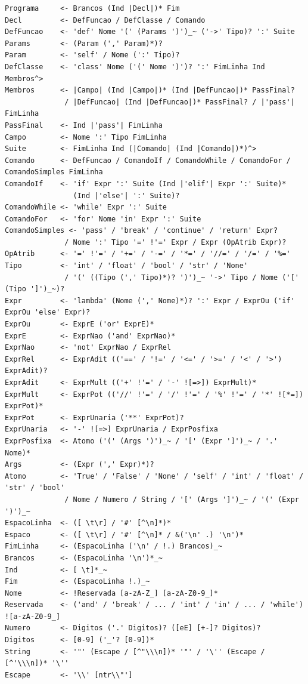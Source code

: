 \documentclass[12pt,a4paper]{article}
\begin{document}
\begin{lstlisting}[style=gram]
Programa     <- Brancos (Ind |Decl|)* Fim
Decl         <- DefFuncao / DefClasse / Comando
DefFuncao    <- 'def' Nome '(' (Params ')')_~ ('->' Tipo)? ':' Suite
Params       <- (Param (',' Param)*)?
Param        <- 'self' / Nome (':' Tipo)?
DefClasse    <- 'class' Nome ('(' Nome ')')? ':' FimLinha Ind Membros^>
Membros      <- |Campo| (Ind |Campo|)* (Ind |DefFuncao|)* PassFinal?
              / |DefFuncao| (Ind |DefFuncao|)* PassFinal? / |'pass'| FimLinha
PassFinal    <- Ind |'pass'| FimLinha
Campo        <- Nome ':' Tipo FimLinha
Suite        <- FimLinha Ind (|Comando| (Ind |Comando|)*)^>
Comando      <- DefFuncao / ComandoIf / ComandoWhile / ComandoFor / ComandoSimples FimLinha
ComandoIf    <- 'if' Expr ':' Suite (Ind |'elif'| Expr ':' Suite)*
                (Ind |'else'| ':' Suite)?
ComandoWhile <- 'while' Expr ':' Suite
ComandoFor   <- 'for' Nome 'in' Expr ':' Suite
ComandoSimples <- 'pass' / 'break' / 'continue' / 'return' Expr?
              / Nome ':' Tipo '=' !'=' Expr / Expr (OpAtrib Expr)?
OpAtrib      <- '=' !'=' / '+=' / '-=' / '*=' / '//=' / '/=' / '%='
Tipo         <- 'int' / 'float' / 'bool' / 'str' / 'None'
              / '(' ((Tipo (',' Tipo)*)? ')')_~ '->' Tipo / Nome ('[' (Tipo ']')_~)?
Expr         <- 'lambda' (Nome (',' Nome)*)? ':' Expr / ExprOu ('if' ExprOu 'else' Expr)?
ExprOu       <- ExprE ('or' ExprE)*
ExprE        <- ExprNao ('and' ExprNao)*
ExprNao      <- 'not' ExprNao / ExprRel
ExprRel      <- ExprAdit (('==' / '!=' / '<=' / '>=' / '<' / '>') ExprAdit)?
ExprAdit     <- ExprMult (('+' !'=' / '-' ![=>]) ExprMult)*
ExprMult     <- ExprPot (('//' !'=' / '/' !'=' / '%' !'=' / '*' ![*=]) ExprPot)*
ExprPot      <- ExprUnaria ('**' ExprPot)?
ExprUnaria   <- '-' ![=>] ExprUnaria / ExprPosfixa
ExprPosfixa  <- Atomo ('(' (Args ')')_~ / '[' (Expr ']')_~ / '.' Nome)*
Args         <- (Expr (',' Expr)*)?
Atomo        <- 'True' / 'False' / 'None' / 'self' / 'int' / 'float' / 'str' / 'bool'
              / Nome / Numero / String / '[' (Args ']')_~ / '(' (Expr ')')_~
EspacoLinha  <- ([ \t\r] / '#' [^\n]*)*
Espaco       <- ([ \t\r] / '#' [^\n]* / &('\n' .) '\n')*
FimLinha     <- (EspacoLinha ('\n' / !.) Brancos)_~
Brancos      <- (EspacoLinha '\n')*_~
Ind          <- [ \t]*_~
Fim          <- (EspacoLinha !.)_~
Nome         <- !Reservada [a-zA-Z_] [a-zA-Z0-9_]*
Reservada    <- ('and' / 'break' / ... / 'int' / 'in' / ... / 'while') ![a-zA-Z0-9_]
Numero       <- Digitos ('.' Digitos)? ([eE] [+-]? Digitos)?
Digitos      <- [0-9] ('_'? [0-9])*
String       <- '"' (Escape / [^"\\\n])* '"' / '\'' (Escape / [^'\\\n])* '\''
Escape       <- '\\' [ntr\\"']
\end{lstlisting}
\end{document}
